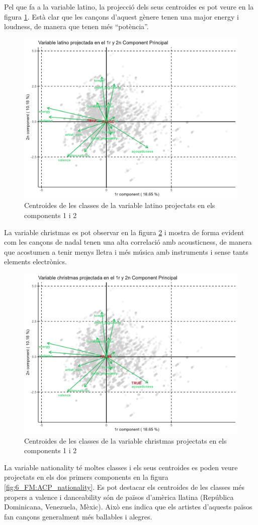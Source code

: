 Pel que fa a la variable latino, la projecció dels seus centroides es pot veure en la figura \ref{fig:6_FM:ACP_latino}. Està clar que les cançons d'aquest gènere tenen una major energy i loudness, de manera que tenen més ``potència''.

\begin{figure}[H]
    \centering
    \includegraphics[width=0.6\linewidth]{Images/6_Factorial_Methods/ACP/Cat_C1_C2_latino.png}
    \caption{Centroides de les classes de la variable latino projectats en els components 1 i 2}
    \label{fig:6_FM:ACP_latino}
\end{figure}

La variable christmas es pot observar en la figura \ref{fig:6_FM:ACP_christmas} i mostra de forma evident com les cançons de nadal tenen una alta correlació amb acousticness, de manera que acostumen a tenir menys lletra i més música amb instruments i sense tants elements electrònics.

\begin{figure}[H]
    \centering
    \includegraphics[width=0.6\linewidth]{Images/6_Factorial_Methods/ACP/Cat_C1_C2_christmas.png}
    \caption{Centroides de les classes de la variable christmas projectats en els components 1 i 2}
    \label{fig:6_FM:ACP_christmas}
\end{figure}

La variable nationality té moltes classes i els seus centroides es poden veure projectats en els dos primers components en la figura \ref{fig:6_FM:ACP_nationality}. Es pot destacar els centroides de les classes més propers a valence i danceability són de països d'amèrica llatina (República Dominicana, Venezuela, Mèxic). Això ens indica que els artistes d'aquests països fan cançons generalment més ballables i alegres.

